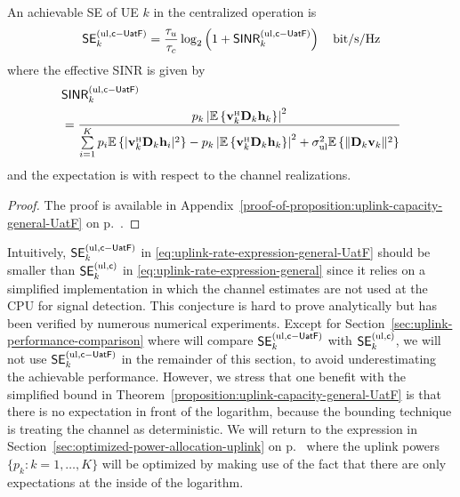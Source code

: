 \begin{theorem} \label{proposition:uplink-capacity-general-UatF}
	An achievable SE of UE $k$ in the centralized operation is
	\begin{equation} \label{eq:uplink-rate-expression-general-UatF}
	\mathsf{SE}_{k}^{({\rm ul},\mathsf{c-UatF})} = \frac{\tau_u}{\tau_c} \log_2  \left( 1 + \mathsf{SINR}_{k}^{({\rm ul},\mathsf{c-UatF})}  \right) \quad \textrm{bit/s/Hz}
	\end{equation}
	where the effective \gls{SINR} is given by
	\begin{align} \nonumber
	&\mathacr{SINR}_{k}^{({\rm ul},\centuatf)} 
	\\ &= \frac{ p_{k} \left |\mathbb{E} \left\{  \vect{v}_{k}^{\Htran} \vect{D}_{k}{\vect{h}}_{k} \right\}\right|^2  }{ 
		\sum\limits_{i=1}^K p_{i}  \mathbb{E} \left\{| \vect{v}_{k}^{\Htran} \vect{D}_{k}{\vect{h}}_{i} |^2\right\}
		- p_{k} \left |\mathbb{E} \left\{  \vect{v}_{k}^{\Htran} \vect{D}_{k}{\vect{h}}_{k} \right\}\right|^2  + \sigmaUL \mathbb{E} \left\{\| \vect{D}_k \vect{v}_{k} \|^2\right\}
	}  \label{eq:uplink-instant-SINR-level4-UatF}
	\end{align}
	and the expectation is with respect to the channel realizations.
\end{theorem}
\begin{proof}
	The proof is available in Appendix~\ref{proof-of-proposition:uplink-capacity-general-UatF} on p.~\pageref{proof-of-proposition:uplink-capacity-general-UatF}.	
\end{proof}

Intuitively, $\mathsf{SE}_{k}^{({\rm ul},\mathsf{c-UatF})}$ in \eqref{eq:uplink-rate-expression-general-UatF} should be smaller than $\mathsf{SE}_{k}^{({\rm ul},\mathsf{c})}$ in \eqref{eq:uplink-rate-expression-general} since it relies on a simplified implementation in which the channel estimates are not used at the CPU for signal detection. This conjecture is hard to prove analytically but has been verified by numerous numerical experiments. Except for Section~\ref{sec:uplink-performance-comparison} where will compare  $\mathsf{SE}_{k}^{({\rm ul},\mathsf{c-UatF})}$ with $\mathsf{SE}_{k}^{({\rm ul},\mathsf{c})}$, we will not use $\mathsf{SE}_{k}^{({\rm ul},\mathsf{c-UatF})}$ in the remainder of this section, to avoid underestimating the achievable performance. However, we stress that one benefit with the simplified bound in Theorem~\ref{proposition:uplink-capacity-general-UatF} is that there is no expectation in front of the logarithm, because the bounding technique is treating the channel as deterministic. We will return to the expression in Section~\ref{sec:optimized-power-allocation-uplink} on p.~\pageref{sec:optimized-power-allocation-uplink} where the uplink powers $\{p_k : k =1,\ldots,K\}$ will be optimized by making use of the fact that there are only expectations at the inside of the logarithm.


